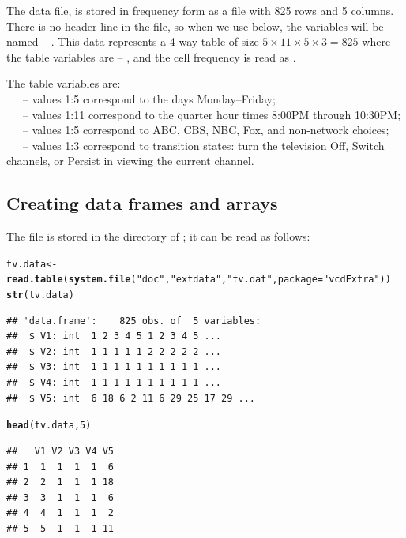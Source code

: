 \documentclass[11pt]{book}\usepackage[]{graphicx}\usepackage[]{color}
\makeatletter
\newcommand{\hlnum}[1]{\textcolor[rgb]{0.686,0.059,0.569}{#1}}%
\newcommand{\hlstr}[1]{\textcolor[rgb]{0.192,0.494,0.8}{#1}}%
\newcommand{\hlstd}[1]{\textcolor[rgb]{0.345,0.345,0.345}{#1}}%
\newcommand{\hlkwb}[1]{\textcolor[rgb]{0.69,0.353,0.396}{#1}}%
\newcommand{\hlkwc}[1]{\textcolor[rgb]{0.333,0.667,0.333}{#1}}%
\newcommand{\hlkwd}[1]{\textcolor[rgb]{0.737,0.353,0.396}{\textbf{#1}}}%
\newenvironment{kframe}{%
 \def\at@end@of@kframe{}%
 \ifinner\ifhmode%
  \def\at@end@of@kframe{\end{minipage}}%
  \begin{minipage}{\columnwidth}%
 \fi\fi%
 \def\FrameCommand##1{\hskip\@totalleftmargin \hskip-\fboxsep
 \colorbox{shadecolor}{##1}\hskip-\fboxsep
     \hskip-\linewidth \hskip-\@totalleftmargin \hskip\columnwidth}%
 \MakeFramed {\advance\hsize-\width
   \@totalleftmargin\z@ \linewidth\hsize
   \@setminipage}}%
 {\par\unskip\endMakeFramed%
 \at@end@of@kframe}
\newenvironment{knitrout}{}{} %
\renewenvironment{knitrout}{\small\renewcommand{\baselinestretch}{.85}}{} %
\makeatother
\begin{document}
The data file,  is stored in frequency form 
as a file with 825 rows and 5 columns.  There is no header line
in the file, so when we use  below, the variables
will be named  -- .  This data represents
 a 4-way table of size
$5 \times 11 \times 5 \times 3 = 825$ where the table variables
are  -- , and the cell frequency is read
as . 

\begin{flushleft}
The table variables are:\\
~~~-- values 1:5 correspond to the days Monday--Friday;\\
~~~-- values 1:11 correspond to the quarter hour times 8:00PM through 10:30PM;\\
~~~-- values 1:5 correspond to ABC, CBS, NBC, Fox, and non-network choices;\\
~~~-- values 1:3 correspond to transition states: turn the television Off, Switch channels,  or Persist in viewing the current channel.
\end{flushleft}

\subsection{Creating data frames and arrays}
The file  is stored in the  directory
of ; it can be read as follows:
\begin{knitrout}
\color{fgcolor}\begin{kframe}
\begin{alltt}
\hlstd{tv.data}\hlkwb{<-}\hlkwd{read.table}\hlstd{(}\hlkwd{system.file}\hlstd{(}\hlstr{"doc"}\hlstd{,}\hlstr{"extdata"}\hlstd{,}\hlstr{"tv.dat"}\hlstd{,}\hlkwc{package}\hlstd{=}\hlstr{"vcdExtra"}\hlstd{))}
\hlkwd{str}\hlstd{(tv.data)}
\end{alltt}
\begin{verbatim}
## 'data.frame':	825 obs. of  5 variables:
##  $ V1: int  1 2 3 4 5 1 2 3 4 5 ...
##  $ V2: int  1 1 1 1 1 2 2 2 2 2 ...
##  $ V3: int  1 1 1 1 1 1 1 1 1 1 ...
##  $ V4: int  1 1 1 1 1 1 1 1 1 1 ...
##  $ V5: int  6 18 6 2 11 6 29 25 17 29 ...
\end{verbatim}
\begin{alltt}
\hlkwd{head}\hlstd{(tv.data,}\hlnum{5}\hlstd{)}
\end{alltt}
\begin{verbatim}
##   V1 V2 V3 V4 V5
## 1  1  1  1  1  6
## 2  2  1  1  1 18
## 3  3  1  1  1  6
## 4  4  1  1  1  2
## 5  5  1  1  1 11
\end{verbatim}
\end{kframe}
\end{knitrout}
\end{document}
